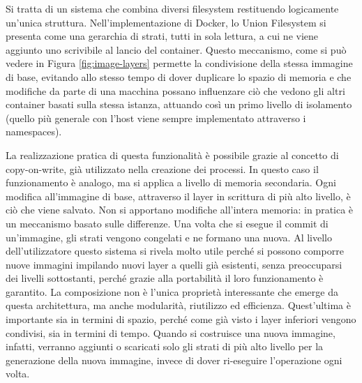 Si tratta di un sistema che combina diversi filesystem restituendo logicamente un'unica struttura. Nell'implementazione di Docker, lo Union Filesystem si presenta come una gerarchia di strati, tutti in sola lettura, a cui ne viene aggiunto uno scrivibile al lancio del container. Questo meccanismo, come si può vedere in Figura \ref{fig:image-layers} permette la condivisione della stessa immagine di base, evitando allo stesso tempo di dover duplicare lo spazio di memoria e che modifiche da parte di una macchina possano influenzare ciò che vedono gli altri container basati sulla stessa istanza, attuando così un primo livello di isolamento (quello più generale con l'host viene sempre implementato attraverso i namespaces). 

La realizzazione pratica di questa funzionalità è possibile grazie al concetto di copy-on-write, già utilizzato nella creazione dei processi. In questo caso il funzionamento è analogo, ma si applica a livello di memoria secondaria. Ogni modifica all'immagine di base, attraverso il layer in scrittura di più alto livello, è ciò che viene salvato. Non si apportano modifiche all'intera memoria: in pratica è un meccanismo basato sulle differenze. Una volta che si esegue il commit di un'immagine, gli strati vengono congelati e ne formano una nuova. Al livello dell'utilizzatore questo sistema si rivela molto utile perché si possono comporre nuove immagini impilando nuovi layer a quelli già esistenti, senza preoccuparsi dei livelli sottostanti, perché grazie alla portabilità il loro funzionamento è garantito. La composizione non è l'unica proprietà interessante che emerge da questa architettura, ma anche modularità, riutilizzo ed efficienza. Quest'ultima è importante sia in termini di spazio, perché come già visto i layer inferiori vengono condivisi, sia in termini di tempo. Quando si costruisce una nuova immagine, infatti, verranno aggiunti o scaricati solo gli strati di più alto livello per la generazione della nuova immagine, invece di dover ri-eseguire l'operazione ogni volta.
  	
